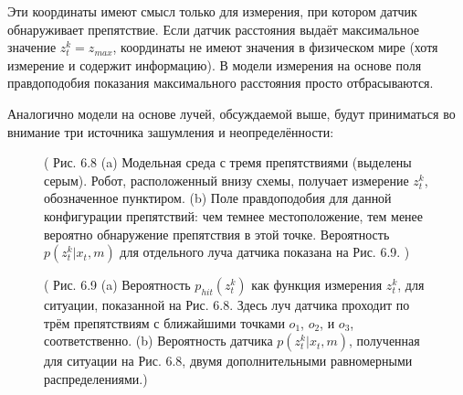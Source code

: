 \documentclass[10pt,a4paper]{article}
\begin{document}
Эти координаты имеют смысл только для измерения, при котором датчик обнаруживает препятствие. 
Если датчик расстояния выдаёт максимальное значение $z_t^k = z_{max}$, координаты не имеют значения в физическом мире (хотя измерение и содержит информацию). В модели измерения на основе поля правдоподобия  показания максимального расстояния просто отбрасываются.

Аналогично модели на основе лучей, обсуждаемой выше, будут приниматься во внимание три источника зашумления и неопределённости: \\
\begin{figure}[H]
	\caption{ (  Рис. 6.8 (a) Модельная среда с тремя препятствиями (выделены серым). Робот, расположенный внизу схемы, получает измерение $z_t^k$, обозначенное пунктиром. (b) Поле правдоподобия для данной конфигурации препятствий: чем темнее местоположение,	тем менее вероятно обнаружение препятствия в этой точке. Вероятность $p(z_t^k | x_t, m)$ для отдельного луча датчика показана на Рис. 6.9.
		)}
	\label{fig:68orig}
\end{figure}

\begin{figure}[H]
	\caption{ (  Рис. 6.9 (a) Вероятность $p_{hit}(z_t^k)$ как функция измерения $z_t^k$, для ситуации, показанной на Рис. 6.8. Здесь луч датчика проходит по трём препятствиям с ближайшими точками $o_1$, $o_2$, и $o_3$, соответственно. (b) Вероятность датчика $p(z_t^k | x_t, m)$, полученная для ситуации на Рис. 6.8, двумя дополнительными равномерными распределениями.)}
	\label{fig:69orig}
\end{figure}
\end{document}
